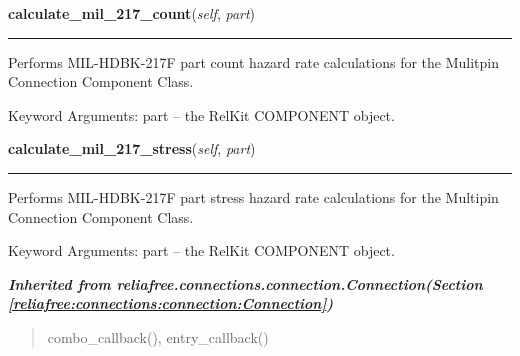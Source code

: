 \hspace{.8\funcindent}\begin{boxedminipage}{\funcwidth}

    \raggedright \textbf{calculate\_mil\_217\_count}(\textit{self}, \textit{part})

    \vspace{-1.5ex}

    \rule{\textwidth}{0.5\fboxrule}
\setlength{\parskip}{2ex}
    Performs MIL-HDBK-217F part count hazard rate calculations for the 
    Mulitpin Connection Component Class.

    Keyword Arguments: part -- the RelKit COMPONENT object.

\setlength{\parskip}{1ex}
    \end{boxedminipage}

    \label{reliafree:connections:multipin:Multipin:calculate_mil_217_stress}

    \vspace{0.5ex}

\hspace{.8\funcindent}\begin{boxedminipage}{\funcwidth}

    \raggedright \textbf{calculate\_mil\_217\_stress}(\textit{self}, \textit{part})

    \vspace{-1.5ex}

    \rule{\textwidth}{0.5\fboxrule}
\setlength{\parskip}{2ex}
    Performs MIL-HDBK-217F part stress hazard rate calculations for the 
    Multipin Connection Component Class.

    Keyword Arguments: part -- the RelKit COMPONENT object.

\setlength{\parskip}{1ex}
    \end{boxedminipage}


\large{\textbf{\textit{Inherited from reliafree.connections.connection.Connection\textit{(Section \ref{reliafree:connections:connection:Connection})}}}}

\begin{quote}
combo\_callback(), entry\_callback()
\end{quote}
